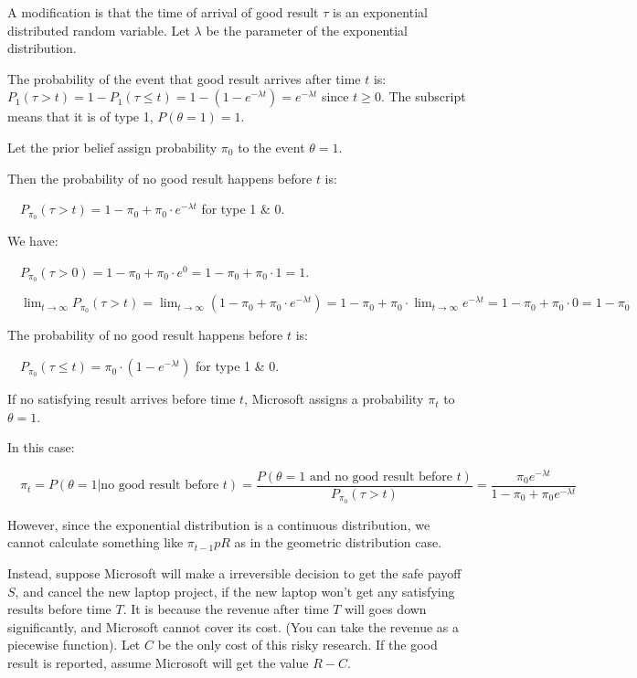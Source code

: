 \documentclass{article}
\begin{document}
A modification is that the time of arrival of good result $\tau $ is an exponential distributed random variable. Let $\lambda$ be the parameter of the exponential distribution. 

The probability of the event that good result arrives after time $t$ is: $P_{1}\left(\tau>t\right)=1-P_{1}\left(\tau\leqslant t\right)=1-\left(1-e^{-\lambda t}\right)=e^{-\lambda t}$ since $t\geqslant0$. The subscript means that it is of type 1, $P\left(\theta=1\right)=1$. 

Let the prior belief assign probability $\pi_{0}$ to the event $\theta=1$. 

Then the probability of no good result happens before $t$ is:

$\quad P_{\pi_{0}}\left(\tau>t\right)=1-\pi_{0}+\pi_{0}\cdot e^{-\lambda t}$ for type 1 \& 0.

We have:

$\quad P_{\pi_{0}}\left(\tau>0\right)=1-\pi_{0}+\pi_{0}\cdot e^{0}=1-\pi_{0}+\pi_{0}\cdot1=1$.

$\quad \displaystyle \lim_{t\to\infty}P_{\pi_{0}}\left(\tau>t\right)=\lim_{t\to\infty}\left(1-\pi_{0}+\pi_{0}\cdot e^{-\lambda t}\right)=1-\pi_{0}+\pi_{0}\cdot\lim_{t\to\infty}e^{-\lambda t}=1-\pi_{0}+\pi_{0}\cdot0=1-\pi_{0}$

The probability of no good result happens before $t$ is:

$\quad P_{\pi_{0}}\left(\tau\leqslant t\right)=\pi_{0}\cdot \left(1-e^{-\lambda t}\right)$ for type 1 \& 0.

If no satisfying result arrives before time $t$, Microsoft assigns a probability $\pi_{t}$ to $\theta=1$.

In this case:

$\quad \pi_{t}=P\left(\theta=1|\text{no good result before } t\right)=\dfrac{P\left(\theta=1\text{ and no good result before } t\right)}{P_{\pi_{0}}\left(\tau>t\right)}=\dfrac{\pi_{0}e^{-\lambda t}}{1-\pi_{0}+\pi_{0}e^{-\lambda t}}$

However, since the exponential distribution is a continuous distribution, we cannot calculate something like $\pi_{t-1}pR$ as in the geometric distribution case.

Instead, suppose Microsoft will make a irreversible decision to get the safe payoff $S$, and cancel the new laptop project, if the new laptop won't get any satisfying results before time $T$. It is because the revenue after time $T$ will goes down significantly, and Microsoft cannot cover its cost. (You can take the revenue as a piecewise function). Let $C$ be the only cost of this risky research. If the good result is reported, assume Microsoft will get the value $R-C$.
\end{document}
